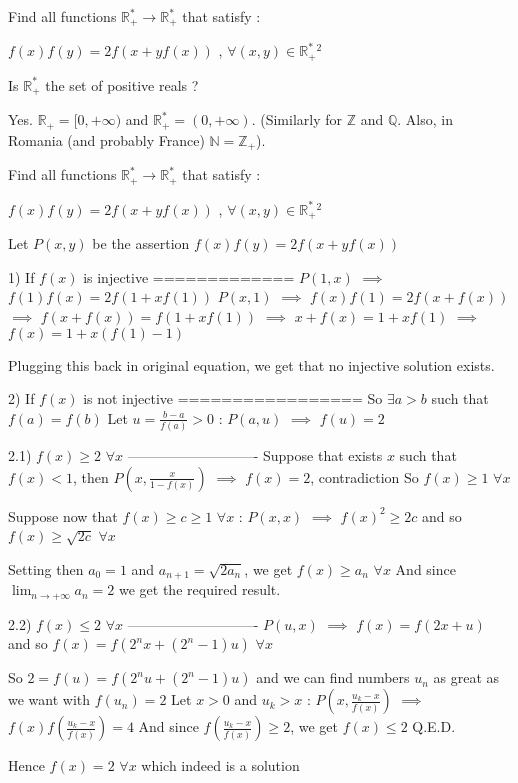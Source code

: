 \begin{solution}
	\begin{tcolorbox}Find all functions $ \mathbb{R}^*_+ \to  \mathbb{R}^*_+ $ that satisfy  : 

$f(x)f(y)=2f(x+yf(x))$ , $\forall (x,y) \in \mathbb{R}^*_+ ^2$\end{tcolorbox}
Is $\mathbb R^*_+$ the set of positive reals ?
\end{solution}



\begin{solution}
	Yes. $\mathbb{R}_+ = [0, +\infty)$ and $\mathbb{R}_+^* = (0, +\infty)$. (Similarly for $\mathbb{Z}$ and $\mathbb{Q}$. Also, in Romania (and probably France) $\mathbb{N} = \mathbb{Z}_+$).
\end{solution}



\begin{solution}
	\begin{tcolorbox}Find all functions $ \mathbb{R}^*_+ \to  \mathbb{R}^*_+ $ that satisfy  : 

$f(x)f(y)=2f(x+yf(x))$ , $\forall (x,y) \in \mathbb{R}^*_+ ^2$\end{tcolorbox}
Let $P(x,y)$ be the assertion $f(x)f(y)=2f(x+yf(x))$

1) If $f(x)$ is injective
=============
$P(1,x)$ $\implies$ $f(1)f(x)=2f(1+xf(1))$
$P(x,1)$ $\implies$ $f(x)f(1)=2f(x+f(x))$
$\implies$ $f(x+f(x))=f(1+xf(1))$ $\implies$ $x+f(x)=1+xf(1)$ $\implies$ $f(x)=1+x(f(1)-1)$

Plugging this back in original equation, we get that no injective solution exists.

2) If $f(x)$ is not injective
=================
So $\exists a>b$ such that $f(a)=f(b)$
Let $u=\frac {b-a}{f(a)}>0$ : $P(a,u)$ $\implies$ $f(u)=2$

2.1) $f(x)\ge 2$ $\forall x$
----------------------------
Suppose that exists $x$ such that $f(x)<1$, then $P(x,\frac x{1-f(x)})$ $\implies$ $f(x)=2$, contradiction
So $f(x)\ge 1$ $\forall x$

Suppose now that $f(x)\ge c\ge 1$ $\forall x$ : $P(x,x)$ $\implies$ $f(x)^2\ge 2c$ and so $f(x)\ge \sqrt{2c}$ $\forall x$

Setting then $a_0=1$ and $a_{n+1}=\sqrt{2a_n}$, we get $f(x)\ge a_n$ $\forall x$
And since $\lim_{n\to+\infty}a_n=2$ we get the required result.

2.2) $f(x)\le 2$ $\forall x$
----------------------------
$P(u,x)$ $\implies$ $f(x)=f(2x+u)$ and so $f(x)=f(2^nx+(2^n-1)u)$ $\forall x$

So $2=f(u)=f(2^nu+(2^n-1)u)$ and we can find numbers $u_n$ as great as we want with $f(u_n)=2$
Let $x>0$ and $u_k>x$ : $P(x,\frac{u_k-x}{f(x)})$ $\implies$ $f(x)f(\frac{u_k-x}{f(x)})=4$
And since $f(\frac{u_k-x}{f(x)})\ge 2$, we get $f(x)\le 2$
Q.E.D.

Hence $\boxed{f(x)=2}$ $\forall x$ which indeed is a solution
\end{solution}



